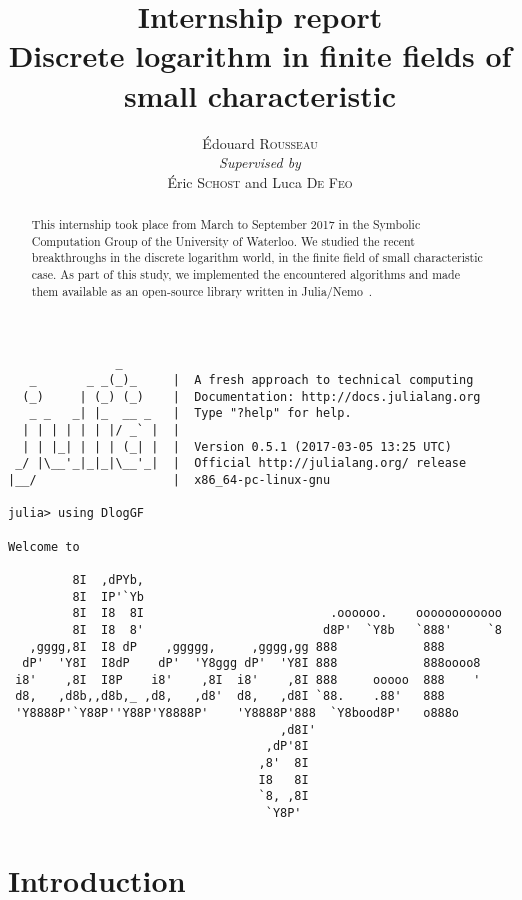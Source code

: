 \documentclass[a4paper,11pt]{article}
\title{Internship report\\\textbf{Discrete logarithm in finite fields of
small characteristic}}
\author{Édouard \textsc{Rousseau}\\\textit{Supervised by}\\Éric \textsc{Schost} and Luca
\textsc{De Feo}}
\theoremstyle{break}
\theoremstyle{sc}
\theoremstyle{definition}
\theoremstyle{remark}
\begin{document}
\maketitle
\begin{verbatim}
               _
   _       _ _(_)_     |  A fresh approach to technical computing
  (_)     | (_) (_)    |  Documentation: http://docs.julialang.org
   _ _   _| |_  __ _   |  Type "?help" for help.
  | | | | | | |/ _` |  |
  | | |_| | | | (_| |  |  Version 0.5.1 (2017-03-05 13:25 UTC)
 _/ |\__'_|_|_|\__'_|  |  Official http://julialang.org/ release
|__/                   |  x86_64-pc-linux-gnu

julia> using DlogGF

Welcome to

         8I  ,dPYb,                       
         8I  IP'`Yb                        
         8I  I8  8I                          .oooooo.    oooooooooooo   
         8I  I8  8'                         d8P'  `Y8b   `888'     `8  
   ,gggg,8I  I8 dP    ,ggggg,     ,gggg,gg 888            888         
  dP'  'Y8I  I8dP    dP'  'Y8ggg dP'  'Y8I 888            888oooo8     
 i8'    ,8I  I8P    i8'    ,8I  i8'    ,8I 888     ooooo  888    '     
 d8,   ,d8b,,d8b,_ ,d8,   ,d8'  d8,   ,d8I `88.    .88'   888           
 'Y8888P'`Y88P''Y88P'Y8888P'    'Y8888P'888  `Y8bood8P'   o888o           
                                      ,d8I'                              
                                    ,dP'8I                               
                                   ,8'  8I                               
                                   I8   8I                               
                                   `8, ,8I                               
                                    `Y8P'                             
\end{verbatim}
\clearpage
\begin{abstract}
This internship took place from March to September 2017 in the Symbolic
Computation Group of the University of Waterloo. We studied the recent
breakthroughs in the discrete logarithm world, in the finite field of small characteristic case.
As part of this study, we implemented the encountered algorithms and made them
available as an open-source library written in Julia/Nemo~\cite{Julia, Nemo}.
\end{abstract}

\tableofcontents
\clearpage

\section{Introduction}
\end{document}
